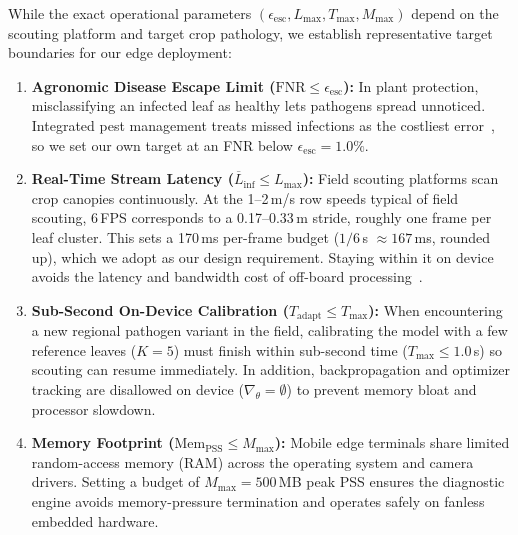 While the exact operational parameters $(\epsilon_{\text{esc}}, L_{\max}, T_{\max}, M_{\max})$ depend on the scouting platform and target crop pathology, we establish representative target boundaries for our edge deployment:
\begin{enumerate}
    \item \textbf{Agronomic Disease Escape Limit ($\text{FNR} \le \epsilon_{\text{esc}}$):} In plant protection, misclassifying an infected leaf as healthy lets pathogens spread unnoticed. Integrated pest management treats missed infections as the costliest error~\cite{richard2022control}, so we set our own target at an FNR below $\epsilon_{\text{esc}} = 1.0\%$.
    \item \textbf{Real-Time Stream Latency ($\overline{L}_{\text{inf}} \le L_{\max}$):} Field scouting platforms scan crop canopies continuously. At the 1--2\,m/s row speeds typical of field scouting, 6\,FPS corresponds to a 0.17--0.33\,m stride, roughly one frame per leaf cluster. This sets a 170\,ms per-frame budget ($1/6$\,s $\approx 167$\,ms, rounded up), which we adopt as our design requirement. Staying within it on device avoids the latency and bandwidth cost of off-board processing~\cite{radocaj2025evolution}.
    \item \textbf{Sub-Second On-Device Calibration ($T_{\text{adapt}} \le T_{\max}$):} When encountering a new regional pathogen variant in the field, calibrating the model with a few reference leaves ($K=5$) must finish within sub-second time ($T_{\max} \le 1.0$\,s) so scouting can resume immediately. In addition, backpropagation and optimizer tracking are disallowed on device ($\nabla_\theta = \emptyset$) to prevent memory bloat and processor slowdown.
    \item \textbf{Memory Footprint ($\text{Mem}_{\text{PSS}} \le M_{\max}$):} Mobile edge terminals share limited random-access memory (RAM) across the operating system and camera drivers. Setting a budget of $M_{\max} = 500$\,MB peak PSS ensures the diagnostic engine avoids memory-pressure termination and operates safely on fanless embedded hardware.
\end{enumerate}

